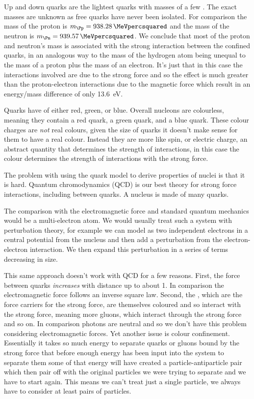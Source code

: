\documentclass[fleqn]{NotesClass}
\begin{document}
    Up and down quarks are the lightest quarks with masses of a few \unit{\MeVpercsquared}.
    The exact masses are unknown as free quarks have never been isolated.
    For comparison the mass of the proton is \(m_{\Pp} = \qty{938.28}{\MeVpercsquared}\) and the mass of the neutron is \(m_{\Pn} = \qty{939.57}{\MeVpercsquared}\).
    We conclude that most of the proton and neutron's mass is associated with the strong interaction between the confined quarks, in an analogous way to the mass of the hydrogen atom being unequal to the mass of a proton plus the mass of an electron.
    It's just that in this case the interactions involved are due to the strong force and so the effect is much greater than the proton-electron interactions due to the magnetic force which result in an energy/mass difference of only \qty{13.6}{\electronvolt}.
    
    Quarks have  of either red, green, or blue.
    Overall nucleons are colourless, meaning they contain a red quark, a green quark, and a blue quark.
    These colour charges are \emph{not} real colours, given the size of quarks it doesn't make sense for them to have a real colour.
    Instead they are more like spin, or electric charge, an abstract quantity that determines the strength of interactions, in this case the colour determines the strength of interactions with the strong force.
    
    The problem with using the quark model to derive properties of nuclei is that it is hard.
    Quantum chromodynamics (QCD) is our best theory for strong force interactions, including between quarks.
    A nucleus is made of many quarks.
    
    The comparison with the electromagnetic force and standard quantum mechanics would be a multi-electron atom.
    We would usually treat such a system with perturbation theory, for example we can model  as two independent electrons in a central potential from the nucleus and then add a perturbation from the electron-electron interaction.
    We then expand this perturbation in a series of terms decreasing in size.
    
    This same approach doesn't work with QCD for a few reasons.
    First, the force between quarks \emph{increases} with distance up to about \qty{1}{\fermi}.
    In comparison the electromagnetic force follows an inverse square law.
    Second, the , which are the force carriers for the strong force, are themselves coloured and so interact with the strong force, meaning more gluons, which interact through the strong force and so on.
    In comparison photons are neutral and so we don't have this problem considering electromagnetic forces.
    Yet another issue is colour confinement.
    Essentially it takes so much energy to separate quarks or gluons bound by the strong force that before enough energy has been input into the system to separate them some of that energy will have created a particle-antiparticle pair which then pair off with the original particles we were trying to separate and we have to start again.
    This means we can't treat just a single particle, we always have to consider at least pairs of particles.
    
\end{document}

